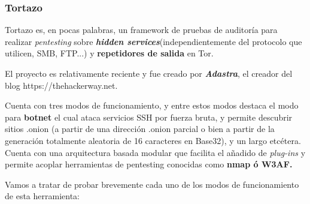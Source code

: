 \subsubsection{Tortazo}
Tortazo es, en pocas palabras, un framework de pruebas de auditoría
para realizar \textit{pentesting} sobre \textit{\textbf{hidden
    services}}(independientemente del protocolo que utilicen, SMB,
FTP...) y \textbf{repetidores de salida} en Tor.

El proyecto es relativamente reciente y fue creado por
\textbf{\textit{Adastra}}, el creador del blog
https://thehackerway.net.

Cuenta con tres modos de funcionamiento, y entre estos modos destaca
el modo para \textbf{botnet} el cual ataca servicios SSH por fuerza
bruta, y permite descubrir sitios .onion (a partir de una dirección
.onion parcial o bien a partir de la generación totalmente aleatoria
de 16 caracteres en Base32), y un largo etcétera. Cuenta con una
arquitectura basada modular que facilita el añadido de
\textit{plug-ins} y permite acoplar herramientas de pentesting
conocidas como \textbf{nmap ó W3AF.}

Vamos a tratar de probar brevemente cada uno de los modos de
funcionamiento de esta herramienta:

